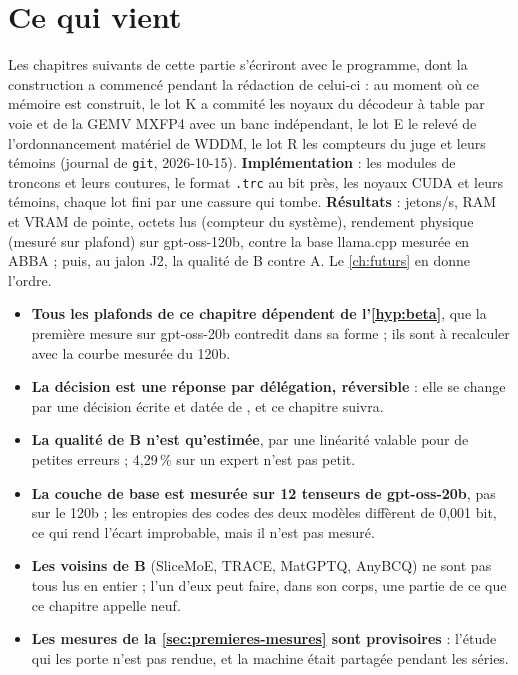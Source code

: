 \section{Ce qui vient}\label{sec:ce-qui-vient}

Les chapitres suivants de cette partie s'écriront avec le programme, dont la construction a commencé pendant la rédaction de celui-ci : au moment où ce mémoire est construit, le lot K a commité les noyaux du décodeur à table par voie et de la GEMV MXFP4 avec un banc indépendant, le lot E le relevé de l'ordonnancement matériel de WDDM, le lot R les compteurs du juge et leurs témoins (journal de \texttt{git}, 2026-10-15). \textbf{Implémentation} : les modules de troncons et leurs coutures, le format \texttt{.trc} au bit près, les noyaux CUDA et leurs témoins, chaque lot fini par une cassure qui tombe. \textbf{Résultats} : jetons/s, RAM et VRAM de pointe, octets lus (compteur du système), rendement physique (mesuré sur plafond) sur gpt-oss-120b, contre la base llama.cpp mesurée en ABBA ; puis, au jalon J2, la qualité de B contre A. Le \cref{ch:futurs} en donne l'ordre.

\begin{faux}
\begin{itemize}
\item \textbf{Tous les plafonds de ce chapitre dépendent de l'\cref{hyp:beta}}, que la première mesure sur gpt-oss-20b contredit dans sa forme ; ils sont à recalculer avec la courbe mesurée du 120b.
\item \textbf{La décision est une réponse par délégation, réversible} : elle se change par une décision écrite et datée de , et ce chapitre suivra.
\item \textbf{La qualité de B n'est qu'estimée}, par une linéarité valable pour de petites erreurs ; 4,29\,\% sur un expert n'est pas petit.
\item \textbf{La couche de base est mesurée sur 12 tenseurs de gpt-oss-20b}, pas sur le 120b ; les entropies des codes des deux modèles diffèrent de 0,001 bit, ce qui rend l'écart improbable, mais il n'est pas mesuré.
\item \textbf{Les voisins de B} (SliceMoE, TRACE, MatGPTQ, AnyBCQ) ne sont pas tous lus en entier ; l'un d'eux peut faire, dans son corps, une partie de ce que ce chapitre appelle neuf.
\item \textbf{Les mesures de la \cref{sec:premieres-mesures} sont provisoires} : l'étude qui les porte n'est pas rendue, et la machine était partagée pendant les séries.
\end{itemize}
\end{faux}
